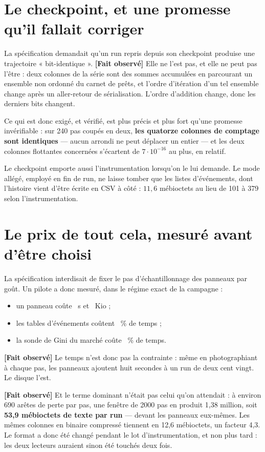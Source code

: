 \documentclass[11pt,a4paper]{article}
\newcommand{\fait}{\textbf{[Fait observé]}}
\begin{document}
\section{Le checkpoint, et une promesse qu'il fallait corriger}

La spécification demandait qu'un run repris depuis son checkpoint produise
une trajectoire « bit-identique ». \fait{} Elle ne l'est pas, et elle ne peut
pas l'être : deux colonnes de la série sont des sommes accumulées en
parcourant un ensemble non ordonné du carnet de prêts, et l'ordre d'itération
d'un tel ensemble change après un aller-retour de sérialisation. L'ordre
d'addition change, donc les derniers bits changent.

Ce qui est donc exigé, et vérifié, est plus précis et plus fort qu'une
promesse invérifiable : sur 240 pas coupés en deux, \textbf{les quatorze
colonnes de comptage sont identiques} --- aucun arrondi ne peut déplacer un
entier --- et les deux colonnes flottantes concernées s'écartent de
$7\cdot10^{-16}$ au plus, en relatif.

Le checkpoint emporte aussi l'instrumentation lorsqu'on le lui demande. Le
mode allégé, employé en fin de run, ne laisse tomber que les listes
d'événements, dont l'histoire vient d'être écrite en CSV à côté : $11{,}6$
mébioctets au lieu de 101 à 379 selon l'instrumentation.

\section{Le prix de tout cela, mesuré avant d'être choisi}

La spécification interdisait de fixer le pas d'échantillonnage des panneaux
par goût. Un pilote a donc mesuré, dans le régime exact de la campagne :

\begin{itemize}
\item un panneau coûte \CoutPanneauSecondes~s et \CoutPanneauKio~Kio ;
\item les tables d'événements coûtent \SurcoutEvenements~\% de temps ;
\item la sonde de Gini du marché coûte \SurcoutGini~\% de temps.
\end{itemize}

\fait{} Le temps n'est donc pas la contrainte : même en photographiant à
chaque pas, les panneaux ajoutent huit secondes à un run de deux cent vingt.
Le disque l'est.

\fait{} Et le terme dominant n'était pas celui qu'on attendait : à environ
690 arêtes de perte par pas, une fenêtre de 2000 pas en produit 1,38 million,
soit \textbf{53,9 mébioctets de texte par run} --- devant les panneaux
eux-mêmes. Les mêmes colonnes en binaire compressé tiennent en 12,6
mébioctets, un facteur 4,3. Le format a donc été changé pendant le lot
d'instrumentation, et non plus tard : les deux lecteurs auraient sinon été
touchés deux fois.
\end{document}
